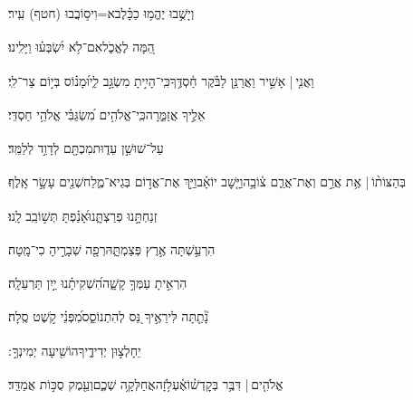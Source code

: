 \documentclass[12pt]{article}
\newcommand{\loc}[1]{\textsuperscript{\locf{#1}}}
\begin{document}
{\loc{ טו}~}‏וְיָשֻׁ֣בוּ  יֶהֱמ֥וּ כַכָּ֗לֶב{\hfill}א=וִיס֥וֹבֲבוּ (חטף) עִֽיר׃\par

{\loc{ טז}~}‏הֵ֭מָּה  לֶאֱכֹ֑ל{\hfill}אִם־לֹ֥א יִ֝שְׂבְּע֗וּ וַיָּלִֽינוּ׃\par

{\loc{ יז}~}‏וַאֲנִ֤י |  אָשִׁ֣יר {\hfill}וַאֲרַנֵּ֥ן לַבֹּ֗קֶר חַ֫סְדֶּ֥ךָ\newline\hspace*{.5em}כִּֽי־הָיִ֣יתָ מִשְׂגָּ֣ב לִ֑י{\hfill}וּ֝מָנ֗וֹס בְּי֣וֹם צַר־לִֽי׃\par

{\loc{ יח}~}‏ אֵלֶ֣יךָ אֲזַמֵּ֑רָה{\hfill}כִּֽי־אֱלֹהִ֥ים מִ֝שְׂגַּבִּ֗י אֱלֹהֵ֥י חַסְדִּֽי׃\par\pend
\ledpb
\pstart[\subsection*{\textcolor{red}{פרק ס}}]\label{פרק ס}
{\loc{ א}~}‏ עַל־שׁוּשַׁ֣ן עֵד֑וּת{\hfill}מִכְתָּ֖ם לְדָוִ֣ד לְלַמֵּֽד׃\par

{\loc{ ב}~}‏בְּהַצּוֹת֨וֹ | {\hfill}אֶ֥ת אֲרַ֣ם \newline\hspace*{.5em}וְאֶת־אֲרַ֢ם צ֫וֹבָ֥ה{\hfill}וַיָּ֤שׇׁב יוֹאָ֗ב\newline\hspace*{.5em}וַיַּ֣ךְ אֶת־אֱד֣וֹם בְּגֵיא־מֶ֑לַח{\hfill}שְׁנֵ֖ים עָשָׂ֣ר אָֽלֶף׃\par

{\loc{ ג}~}‏ זְנַחְתָּ֣נוּ פְרַצְתָּ֑נוּ{\hfill}אָ֝נַ֗פְתָּ תְּשׁ֣וֹבֵֽב לָֽנוּ׃\par

{\loc{ ד}~}‏הִרְעַ֣שְׁתָּה אֶ֣רֶץ פְּצַמְתָּ֑הּ{\hfill}רְפָ֖ה שְׁבָרֶ֣יהָ כִי־מָֽטָה׃\par

{\loc{ ה}~}‏הִרְאִ֣יתָ עַמְּךָ֣ קָשָׁ֑ה{\hfill}הִ֝שְׁקִיתָ֗נוּ יַ֣יִן תַּרְעֵלָֽה׃\par

{\loc{ ו}~}‏נָ֘תַ֤תָּה לִּירֵאֶ֣יךָ נֵּ֭ס לְהִתְנוֹסֵ֑ס{\hfill}מִ֝פְּנֵ֗י קֹ֣שֶׁט סֶֽלָה׃\par

{\loc{ ז}~}‏ יֵחָלְצ֣וּן יְדִידֶ֑יךָ{\hfill}הוֹשִׁ֖יעָה יְמִינְךָ֣ ׃\par

{\loc{ ח}~}‏אֱלֹהִ֤ים |  דִּבֶּ֥ר בְּקׇדְשׁ֗וֹ{\hfill}אֶ֫עְלֹ֥זָה\newline\hspace*{.5em}אֲחַלְּקָ֥ה שְׁכֶ֑ם{\hfill}וְעֵ֖מֶק סֻכּ֣וֹת אֲמַדֵּֽד׃\par
\end{document}
